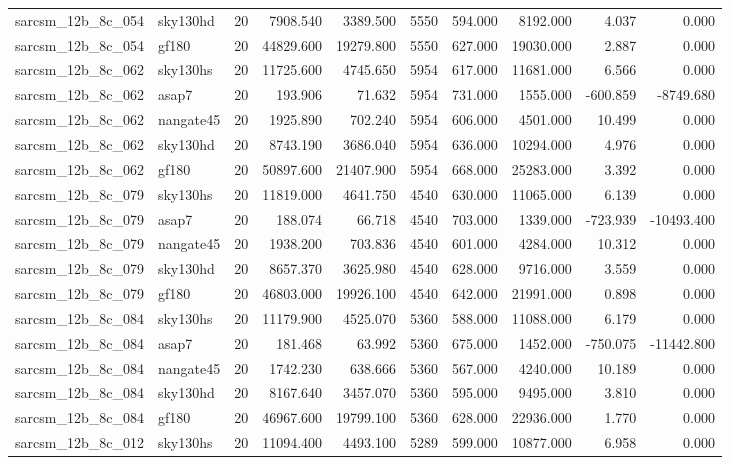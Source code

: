 \documentclass{article}
\begin{document}
\begin{longtable}{llrrrrrrrr}
sarcsm\_12b\_8c\_054 & sky130hd & 20 & 7908.540 & 3389.500 & 5550 & 594.000 & 8192.000 & 4.037 & 0.000 \\
sarcsm\_12b\_8c\_054 & gf180 & 20 & 44829.600 & 19279.800 & 5550 & 627.000 & 19030.000 & 2.887 & 0.000 \\
sarcsm\_12b\_8c\_062 & sky130hs & 20 & 11725.600 & 4745.650 & 5954 & 617.000 & 11681.000 & 6.566 & 0.000 \\
sarcsm\_12b\_8c\_062 & asap7 & 20 & 193.906 & 71.632 & 5954 & 731.000 & 1555.000 & -600.859 & -8749.680 \\
sarcsm\_12b\_8c\_062 & nangate45 & 20 & 1925.890 & 702.240 & 5954 & 606.000 & 4501.000 & 10.499 & 0.000 \\
sarcsm\_12b\_8c\_062 & sky130hd & 20 & 8743.190 & 3686.040 & 5954 & 636.000 & 10294.000 & 4.976 & 0.000 \\
sarcsm\_12b\_8c\_062 & gf180 & 20 & 50897.600 & 21407.900 & 5954 & 668.000 & 25283.000 & 3.392 & 0.000 \\
sarcsm\_12b\_8c\_079 & sky130hs & 20 & 11819.000 & 4641.750 & 4540 & 630.000 & 11065.000 & 6.139 & 0.000 \\
sarcsm\_12b\_8c\_079 & asap7 & 20 & 188.074 & 66.718 & 4540 & 703.000 & 1339.000 & -723.939 & -10493.400 \\
sarcsm\_12b\_8c\_079 & nangate45 & 20 & 1938.200 & 703.836 & 4540 & 601.000 & 4284.000 & 10.312 & 0.000 \\
sarcsm\_12b\_8c\_079 & sky130hd & 20 & 8657.370 & 3625.980 & 4540 & 628.000 & 9716.000 & 3.559 & 0.000 \\
sarcsm\_12b\_8c\_079 & gf180 & 20 & 46803.000 & 19926.100 & 4540 & 642.000 & 21991.000 & 0.898 & 0.000 \\
sarcsm\_12b\_8c\_084 & sky130hs & 20 & 11179.900 & 4525.070 & 5360 & 588.000 & 11088.000 & 6.179 & 0.000 \\
sarcsm\_12b\_8c\_084 & asap7 & 20 & 181.468 & 63.992 & 5360 & 675.000 & 1452.000 & -750.075 & -11442.800 \\
sarcsm\_12b\_8c\_084 & nangate45 & 20 & 1742.230 & 638.666 & 5360 & 567.000 & 4240.000 & 10.189 & 0.000 \\
sarcsm\_12b\_8c\_084 & sky130hd & 20 & 8167.640 & 3457.070 & 5360 & 595.000 & 9495.000 & 3.810 & 0.000 \\
sarcsm\_12b\_8c\_084 & gf180 & 20 & 46967.600 & 19799.100 & 5360 & 628.000 & 22936.000 & 1.770 & 0.000 \\
sarcsm\_12b\_8c\_012 & sky130hs & 20 & 11094.400 & 4493.100 & 5289 & 599.000 & 10877.000 & 6.958 & 0.000 \\

\end{longtable}
\end{document}
